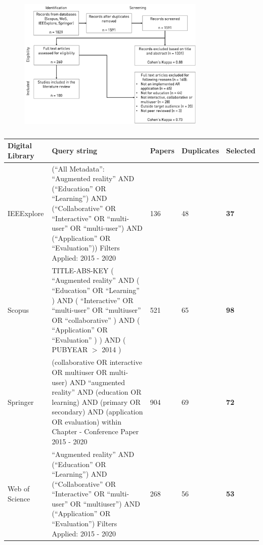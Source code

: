 \begin{figure}[htbp]	
	\begin{center}
	\includegraphics[width=0.8\textwidth]{figures/Prisma_flowchart_2.png}
	\captionsetup{font=small}
	\caption{\fontsize{10pt}{11pt}}
	\label{fig:flowchart}
    \end{center}
\end{figure}


\begin{table}[t]
\small
\begin{tabular}{M{1.9cm}M{6cm}M{1cm}M{1.65cm}M{1.15cm}}
    \toprule
         \textbf{Digital Library} & \textbf{Query string} & \textbf{Papers} & \textbf{Duplicates} & \textbf{Selected} \\
    \midrule
         IEEExplore    &  (``All Metadata'': ``Augmented reality'' AND (``Education'' OR ``Learning'') AND (``Collaborative'' OR ``Interactive'' OR ``multi-user'' OR ``multi-user'') AND (``Application'' OR ``Evaluation'')) Filters Applied: 2015 - 2020 & 136 & 48 & \textbf{37} \\
    \midrule
        Scopus         & TITLE-ABS-KEY ( ``Augmented reality''  AND  ( ``Education''  OR  ``Learning'' )  AND  ( ``Interactive''  OR  ``multi-user''  OR  ``multiuser'' OR ``collaborative'' )  AND  ( ``Application''  OR  ``Evaluation'' ) )  AND  ( PUBYEAR $>$ 2014 )  & 521 & 65 & \textbf{98} \\
    \midrule
        Springer       & (collaborative OR interactive OR multiuser OR multi-user) AND ``augmented reality'' AND (education OR learning) AND (primary OR secondary) AND (application OR evaluation)
        within Chapter - Conference Paper  2015 - 2020  & 904 & 69 & \textbf{72} \\
    \midrule
        Web of Science & ``Augmented reality'' AND (``Education'' OR ``Learning'') AND (``Collaborative'' OR ``Interactive'' OR ``multi-user'' OR ``multiuser'') AND (``Application'' OR ``Evaluation'') Filters Applied: 2015 - 2020 & 268 & 56 & \textbf{53} \\
    \bottomrule
\end{tabular}
\caption{\fontsize{10pt}{11pt}}
\label{tab:searchstring}
\end{table}